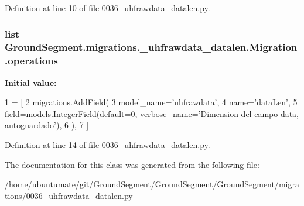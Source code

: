Definition at line 10 of file 0036\+\_\+uhfrawdata\+\_\+datalen.\+py.

\hypertarget{class_ground_segment_1_1migrations_1_10036__uhfrawdata__datalen_1_1_migration_a9dc0a96e973aa38ed761fb6261e840d1}{}
\subsubsection[{operations}]{\setlength{\rightskip}{0pt plus 5cm}list Ground\+Segment.\+migrations.\+\_\+uhfrawdata\+\_\+datalen.\+Migration.\+operations\hspace{0.3cm}{\ttfamily [static]}}\label{class_ground_segment_1_1migrations_1_10036__uhfrawdata__datalen_1_1_migration_a9dc0a96e973aa38ed761fb6261e840d1}
{\bfseries Initial value\+:}
\begin{DoxyCode}
1 = [
2         migrations.AddField(
3             model\_name=\textcolor{stringliteral}{'uhfrawdata'},
4             name=\textcolor{stringliteral}{'dataLen'},
5             field=models.IntegerField(default=0, verbose\_name=\textcolor{stringliteral}{'Dimension del campo data, autoguardado'}),
6         ),
7     ]
\end{DoxyCode}


Definition at line 14 of file 0036\+\_\+uhfrawdata\+\_\+datalen.\+py.



The documentation for this class was generated from the following file\+:\begin{DoxyCompactItemize}
\item 
/home/ubuntumate/git/\+Ground\+Segment/\+Ground\+Segment/\+Ground\+Segment/migrations/\hyperlink{0036__uhfrawdata__datalen_8py}{0036\+\_\+uhfrawdata\+\_\+datalen.\+py}\end{DoxyCompactItemize}
